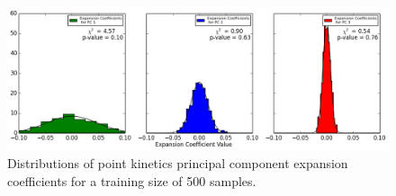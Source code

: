 \begin{figure}[!h]
\caption{\label{fig:pk_coeff_distributions}
Distributions of point kinetics principal component expansion coefficients for a training size of 500 samples.}
 \begin{center}
  \includegraphics[scale=.5]{./Chapter4/pk_coeff_distributions.png}
 \end{center}
\end{figure} 

